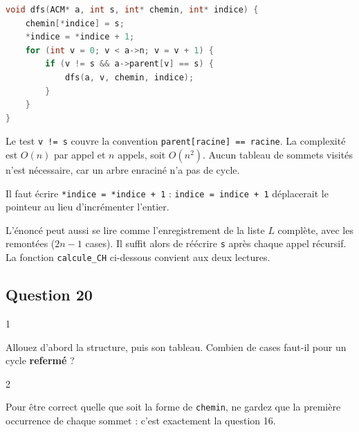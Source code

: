 \documentclass[11pt,a4paper]{article}
\begin{document}
\begin{lstlisting}[language=C]
void dfs(ACM* a, int s, int* chemin, int* indice) {
    chemin[*indice] = s;
    *indice = *indice + 1;
    for (int v = 0; v < a->n; v = v + 1) {
        if (v != s && a->parent[v] == s) {
            dfs(a, v, chemin, indice);
        }
    }
}
\end{lstlisting}

Le test \texttt{v\ !=\ s} couvre la convention \texttt{parent{[}racine{]}\allowbreak{}\ =\allowbreak{}=\allowbreak{}\ racine}. La complexité est \(O(n)\) par appel et \(n\) appels, soit \(O(n^2)\). Aucun tableau de sommets visités n'est nécessaire, car un arbre enraciné n'a pas de cycle.

\begin{piege}

Il faut écrire \texttt{*indice\ =\allowbreak{}\ *indice\ +\ 1} : \texttt{indice\ =\allowbreak{}\ indice\ +\ 1} déplacerait le pointeur au lieu d'incrémenter l'entier.

\end{piege}

\begin{methode}

L'énoncé peut aussi se lire comme l'enregistrement de la liste \(L\) complète, avec les remontées (\(2n-1\) cases). Il suffit alors de réécrire \texttt{s} après chaque appel récursif. La fonction \texttt{calcule\_CH} ci-dessous convient aux deux lectures.

\end{methode}

\hypertarget{question-20}{%
\subsection{Question 20}\label{question-20}}

\begin{indication}{1}

Allouez d'abord la structure, puis son tableau. Combien de cases faut-il pour un cycle \textbf{refermé} ?

\end{indication}

\begin{indication}{2}

Pour être correct quelle que soit la forme de \texttt{chemin}, ne gardez que la première occurrence de chaque sommet : c'est exactement la question 16.

\end{indication}
\end{document}
